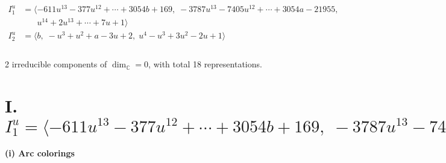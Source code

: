 \documentclass[1p]{elsarticle_modified}
\theoremstyle{definition}
\begin{document}
\begin{align*}
I^u_{1}&=\langle 
-611 u^{13}-377 u^{12}+\cdots+3054 b+169,\;-3787 u^{13}-7405 u^{12}+\cdots+3054 a-21955,\\
\phantom{I^u_{1}}&\phantom{= \langle  }u^{14}+2 u^{13}+\cdots+7 u+1\rangle \\
I^u_{2}&=\langle 
b,\;- u^3+u^2+a-3 u+2,\;u^4- u^3+3 u^2-2 u+1\rangle \\
\\
\end{align*}
\raggedright * 2 irreducible components of $\dim_{\mathbb{C}}=0$, with total 18 representations.\\
\newpage
\renewcommand{\arraystretch}{1}
\centering \section*{I. $I^u_{1}= \langle -611 u^{13}-377 u^{12}+\cdots+3054 b+169,\;-3787 u^{13}-7405 u^{12}+\cdots+3054 a-21955,\;u^{14}+2 u^{13}+\cdots+7 u+1 \rangle$}
\flushleft \textbf{(i) Arc colorings}\\
\end{document}
